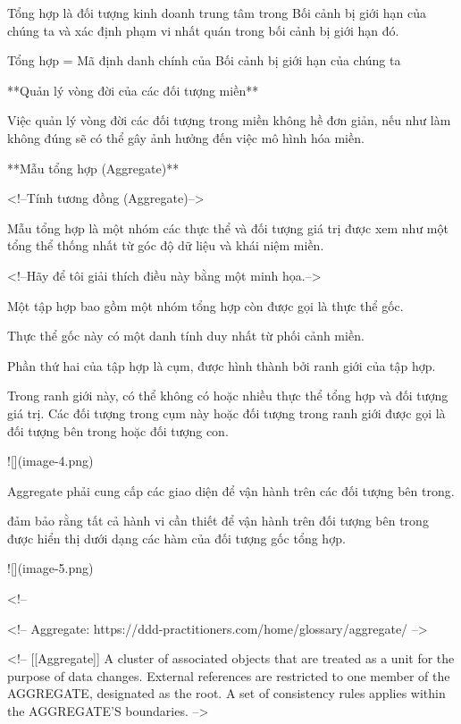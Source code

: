 

Tổng hợp là đối tượng kinh doanh trung tâm trong Bối cảnh bị giới hạn của chúng ta và xác định phạm vi nhất quán trong bối cảnh bị giới hạn đó.

Tổng hợp = Mã định danh chính của Bối cảnh bị giới hạn của chúng ta










**Quản lý vòng đời của các đối tượng miền**

Việc quản lý vòng đời các đối tượng trong miền không hề đơn giản, nếu như làm không đúng sẽ có thể gây ảnh hưởng đến việc mô hình hóa miền.

**Mẫu tổng hợp (Aggregate)**

<!--Tính tương đồng (Aggregate)-->

Mẫu tổng hợp là một nhóm các thực thể và đối tượng giá trị được xem như một tổng thể thống nhất từ ​​góc độ dữ liệu và khái niệm miền.

<!--Hãy để tôi giải thích điều này bằng một minh họa.-->

Một tập hợp bao gồm một nhóm tổng hợp còn được gọi là thực thể gốc.

Thực thể gốc này có một danh tính duy nhất từ ​​phối cảnh miền.

Phần thứ hai của tập hợp là cụm, được hình thành bởi ranh giới của tập hợp.

Trong ranh giới này, có thể không có hoặc nhiều thực thể tổng hợp và đối tượng giá trị. Các đối tượng trong cụm này hoặc đối tượng trong ranh giới được gọi là đối tượng bên trong hoặc đối tượng con.

![](image-4.png)

Aggregate phải cung cấp các giao diện để vận hành trên các đối tượng bên trong.

đảm bảo rằng tất cả hành vi cần thiết để vận hành trên đối tượng bên trong được hiển thị dưới dạng các hàm của đối tượng gốc tổng hợp.

![](image-5.png)




<!-- %

<!-- Aggregate: https://ddd-practitioners.com/home/glossary/aggregate/ -->

<!-- [[Aggregate]] A cluster of associated objects that are treated as a unit for the purpose of data changes. External references are restricted to one member of the AGGREGATE, designated as the root. A set of consistency rules applies within the AGGREGATE’S boundaries. -->

